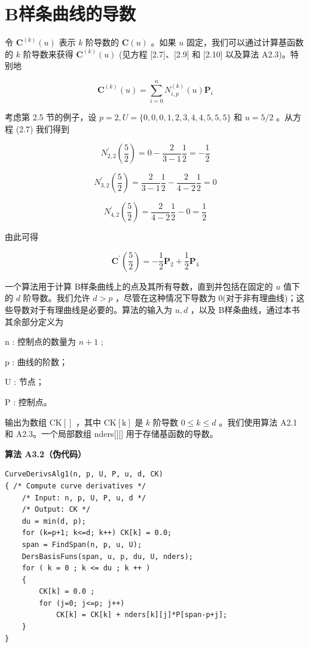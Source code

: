 \documentclass[../main.tex]{subfiles}
\begin{document}
\section{B样条曲线的导数}

令 \({\mathbf{C}}^{\left( k\right) }\left( u\right)\) 表示 \(k\) 阶导数的 \(\mathbf{C}\left( u\right)\) 。如果 \(u\) 固定，我们可以通过计算基函数的 \(k\) 阶导数来获得 \({\mathbf{C}}^{\left( k\right) }\left( u\right)\) (见方程 [2.7]、[2.9] 和 [2.10] 以及算法 A2.3)。特别地

\[
{\mathbf{C}}^{\left( k\right) }\left( u\right)  = \mathop{\sum }\limits_{{i = 0}}^{n}{N}_{i,p}^{\left( k\right) }\left( u\right) {\mathbf{P}}_{i} \tag{3.3}
\]

考虑第 2.5 节的例子，设 \(p = 2,U = \{ 0,0,0,1,2,3,4,4,5,5,5\}\) 和 \(u = 5/2\) 。从方程 (2.7) 我们得到

\[
{N}_{2,2}^{\prime }\left( \frac{5}{2}\right)  = 0 - \frac{2}{3 - 1}\frac{1}{2} =  - \frac{1}{2}
\]

\[
{N}_{3,2}^{\prime }\left( \frac{5}{2}\right)  = \frac{2}{3 - 1}\frac{1}{2} - \frac{2}{4 - 2}\frac{1}{2} = 0
\]

\[
{N}_{4,2}^{\prime }\left( \frac{5}{2}\right)  = \frac{2}{4 - 2}\frac{1}{2} - 0 = \frac{1}{2}
\]

由此可得

\[
{\mathbf{C}}^{\prime }\left( \frac{5}{2}\right)  =  - \frac{1}{2}{\mathbf{P}}_{2} + \frac{1}{2}{\mathbf{P}}_{4}
\]





一个算法用于计算 B样条曲线上的点及其所有导数，直到并包括在固定的 \(u\) 值下的 \(d\) 阶导数。我们允许 \(d > p\) ，尽管在这种情况下导数为 0(对于非有理曲线)；这些导数对于有理曲线是必要的。算法的输入为 \(u,d\) ，以及 B样条曲线，通过本书其余部分定义为

n : 控制点的数量为 \(n + 1\) ;

p : 曲线的阶数；

U : 节点；

P : 控制点。

输出为数组 \(\mathrm{{CK}}\left\lbrack  \right\rbrack\) ，其中 \(\mathrm{{CK}}\left\lbrack  \mathrm{k}\right\rbrack\) 是 \(k\) 阶导数 \(0 \leq  k \leq  d\) 。我们使用算法 A2.1 和 A2.3。一个局部数组 nders[][] 用于存储基函数的导数。

\par\medskip\noindent\textbf{算法 A3.2（伪代码）}\par
\begin{verbatim}
CurveDerivsAlg1(n, p, U, P, u, d, CK)
{ /* Compute curve derivatives */
    /* Input: n, p, U, P, u, d */
    /* Output: CK */
    du = min(d, p);
    for (k=p+1; k<=d; k++) CK[k] = 0.0;
    span = FindSpan(n, p, u, U);
    DersBasisFuns(span, u, p, du, U, nders);
    for ( k = 0 ; k <= du ; k ++ )
    {
        CK[k] = 0.0 ;
        for (j=0; j<=p; j++)
            CK[k] = CK[k] + nders[k][j]*P[span-p+j];
    }
}
\end{verbatim}
\end{document}

